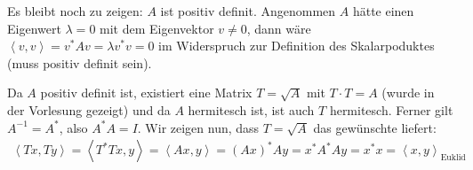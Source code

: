 Es bleibt noch zu zeigen: $A$ ist positiv definit. Angenommen $A$ hätte einen
Eigenwert $\lambda = 0$ mit dem Eigenvektor $v \ne 0$, dann wäre
$\left<v,v\right> = v^* A v = \lambda v^* v = 0$ im Widerspruch zur Definition
des Skalarpoduktes (muss positiv definit sein).

Da $A$ positiv definit ist, existiert eine Matrix $T = \sqrt{A}$ mit $T \cdot T = A$
(wurde in der Vorlesung gezeigt) und da $A$ hermitesch ist, ist auch $T$ hermitesch.
Ferner gilt $A^{-1} = A^*$, also  $A^* A = I$.
Wir zeigen nun, dass $T = \sqrt{A}$ das gewünschte liefert:
\begin{align*}
  \left<T x,T y\right> = \left<T^* T x, y\right> =  \left<A x, y\right> = (A x)^* A y
  = x^* A^* A y = x^* x = \left<x,y\right>_\text{Euklid}
\end{align*}








